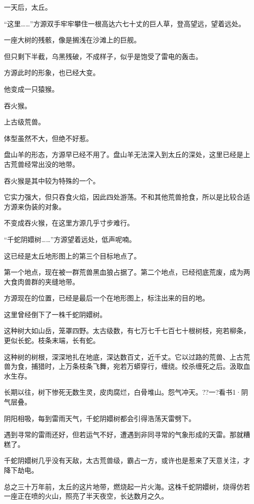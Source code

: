 
\begin{this_body}

一天后，太丘。

“这里……”方源双手牢牢攀住一根高达六七十丈的巨人草，登高望远，望着远处。

一座大树的残骸，像是搁浅在沙滩上的巨舰。

但只剩下半截，乌黑残破，不成样子，似乎是饱受了雷电的轰击。

方源此时的形象，也已经大变。

他变成一只猿猴。

吞火猴。

上古级荒兽。

体型虽然不大，但绝不好惹。

盘山羊的形态，方源早已经不用了。盘山羊无法深入到太丘的深处，这里已经是上古荒兽经常出没的地带。

吞火猴是其中较为特殊的一个。

它实力强大，但只吞食火焰，因此四处游荡。不和其他荒兽抢食，所以是比较合适方源来伪装的对象。

不变成吞火猴，在这里方源几乎寸步难行。

“千蛇阴嬛树……”方源望着远处，低声呢喃。

这已经是太丘地形图上的第三个目标地点了。

第一个地点，现在被一群荒兽黑血狼占据了。第二个地点，已经彻底荒废，成为两大食肉兽群的夹缝地带。

方源现在的位置，已经是最后一个在地形图上，标注出来的目的地。

这里曾经倒下了一株千蛇阴嬛树。

这种树大如山岳，笼罩四野。太古级数，有七万七千七百七十根树枝，宛若柳条，更似长蛇。枝条末端，长有蛇。

这种树的树根，深深地扎在地底，深达数百丈，近千丈。它以过路的荒兽、上古荒兽为食，捕猎时，上万条枝条飞舞，宛若万蟒穿行，缠绕。绞杀缠死之后。汲取血水生存。

长期以往，树下惨死无数生灵，皮肉腐烂，白骨堆山。怨气冲天。??一?看书1·阴气层叠。

阴阳相吸，每到雷雨天气，千蛇阴嬛树都会引得浩荡天雷劈下。

遇到寻常的雷雨还好，但若运气不好，遭遇到非同寻常的气象形成的天雷。那就糟糕了。

千蛇阴嬛树几乎没有天敌，太古荒兽级，霸占一方，或许也是惹来了天意关注，才降下劫电。

总之三十万年前，太丘的这片地带，燃烧起一片火海。这株千蛇阴嬛树，烧得仿若一座正在喷的火山，照亮了半天夜空，长达数月之久。


\end{this_body}
